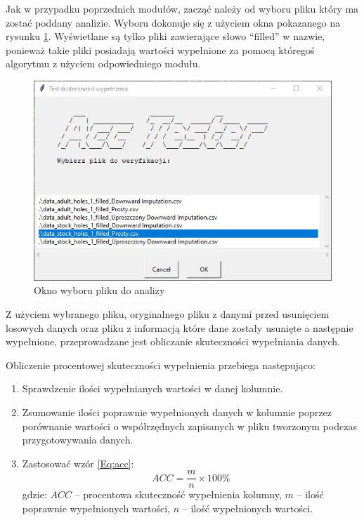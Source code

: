\documentclass[12pt,twoside]{article}
\begin{document}
Jak w przypadku poprzednich modułów, zacząć należy od wyboru pliku który ma zostać poddany analizie.
Wyboru dokonuje się z użyciem okna pokazanego na rysunku \ref{Fig:acc_file}.
Wyświetlane są tylko pliki zawierające słowo ``filled'' w nazwie, ponieważ takie pliki
posiadają wartości wypełnione za pomocą któregoś algorytmu z użyciem odpowiedniego modułu.

\begin{figure}[ht]
    \centering
    \includegraphics[width=12cm]{img/08.jpg}
    \caption{Okno wyboru pliku do analizy}
    \label{Fig:acc_file}
\end{figure}
\FloatBarrier

Z użyciem wybranego pliku, oryginalnego pliku z danymi przed usunięciem losowych danych
oraz pliku z informacją które dane zostały usunięte a następnie wypełnione,
przeprowadzane jest obliczanie skuteczności wypełniania danych.

Obliczenie procentowej skuteczności wypełnienia przebiega następująco:

\begin{enumerate}[label=\arabic*), leftmargin=1.25cm]
    \item Sprawdzenie ilości wypełnianych wartości w danej kolumnie.
    \item Zsumowanie ilości poprawnie wypełnionych danych w kolumnie poprzez porównanie wartości o współrzędnych
          zapisanych w pliku tworzonym podczas przygotowywania danych.
    \item Zastosować wzór \ref{Eq:acc}:
          \begin{equation}
              ACC=\frac{m}{n}\times100\%
              \label{Eq:acc}
          \end{equation}
          gdzie: $ACC$ -- procentowa skuteczność wypełnienia kolumny,
          $m$ -- ilość poprawnie wypełnionych wartości,
          $n$ -- ilość wypełnionych wartości.
\end{enumerate}
\end{document}
